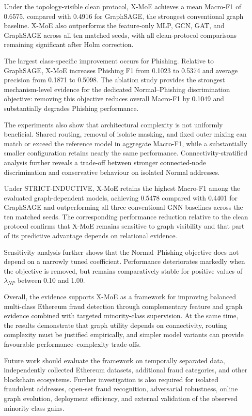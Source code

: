 \documentclass{ieeeaccess}
\begin{document}
Under the topology-visible clean protocol, X-MoE achieves a mean Macro-F1 of 0.6575, compared with 0.4916 for GraphSAGE, the strongest conventional graph baseline. X-MoE also outperforms the feature-only MLP, GCN, GAT, and GraphSAGE across all ten matched seeds, with all clean-protocol comparisons remaining significant after Holm correction.

The largest class-specific improvement occurs for Phishing. Relative to GraphSAGE, X-MoE increases Phishing F1 from 0.1023 to 0.5374 and average precision from 0.1871 to 0.5098. The ablation study provides the strongest mechanism-level evidence for the dedicated Normal--Phishing discrimination objective: removing this objective reduces overall Macro-F1 by 0.1049 and substantially degrades Phishing performance.

The experiments also show that architectural complexity is not uniformly beneficial. Shared routing, removal of isolate masking, and fixed outer mixing can match or exceed the reference model in aggregate Macro-F1, while a substantially smaller configuration retains nearly the same performance. Connectivity-stratified analysis further reveals a trade-off between stronger connected-node discrimination and conservative behaviour on isolated Normal addresses.

Under STRICT-INDUCTIVE, X-MoE retains the highest Macro-F1 among the evaluated graph-dependent models, achieving 0.5478 compared with 0.4401 for GraphSAGE and outperforming all three conventional GNN baselines across the ten matched seeds. The corresponding performance reduction relative to the clean protocol confirms that X-MoE remains sensitive to graph visibility and that part of its predictive advantage depends on relational evidence.

Sensitivity analysis further shows that the Normal--Phishing objective does not depend on a narrowly tuned coefficient. Performance deteriorates markedly when the objective is removed, but remains comparatively stable for positive values of \(\lambda_{NP}\) between 0.10 and 1.00.

Overall, the evidence supports X-MoE as a framework for improving balanced multi-class Ethereum fraud detection through complementary feature and graph evidence combined with targeted minority-class supervision. At the same time, the results demonstrate that graph utility depends on connectivity, routing complexity must be justified empirically, and simpler model variants can provide favourable performance--complexity trade-offs.

Future work should evaluate the framework on temporally separated data, independently collected Ethereum datasets, additional fraud categories, and other blockchain ecosystems. Further investigation is also required for isolated fraudulent addresses, open-set fraud recognition, adversarial robustness, online graph evolution, deployment efficiency, and external validation of the observed minority-class gains.



\balance


\end{document}
